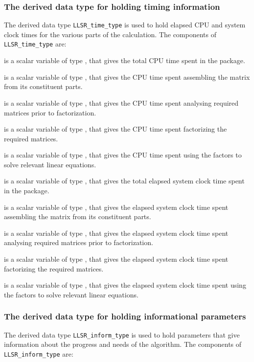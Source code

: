 \documentclass{galahad}
\newcommand{\packagename}{LLSR}
\begin{document}
\subsubsection{The derived data type for holding timing
 information}\label{typetime}
The derived data type
{\tt \packagename\_time\_type}
is used to hold elapsed CPU and system clock times for the various parts of
the calculation. The components of
{\tt \packagename\_time\_type}
are:
\begin{description}
 is a scalar variable of type \realdp, that gives
 the total CPU time spent in the package.

 is a scalar variable of type \realdp, that gives
 the CPU time spent assembling the matrix  from its constituent parts.

 is a scalar variable of type \realdp, that gives
 the CPU time spent analysing required matrices prior to factorization.

 is a scalar variable of type \realdp, that gives
 the CPU time spent factorizing the required matrices.

 is a scalar variable of type \realdp, that gives
 the CPU time spent using the factors to solve relevant linear equations.

 is a scalar variable of type \realdp, that gives
 the total elapsed system clock time spent in the package.

 is a scalar variable of type \realdp, that gives
 the elapsed system clock time spent assembling the matrix  from
its constituent parts.

 is a scalar variable of type \realdp, that gives
 the elapsed system clock time spent analysing required matrices prior to
factorization.

 is a scalar variable of type \realdp, that gives
 the elapsed system clock time spent factorizing the required matrices.

 is a scalar variable of type \realdp, that gives
 the elapsed system clock time spent using the factors to solve relevant
linear equations.

\end{description}


\subsubsection{The derived data type for holding informational
 parameters}\label{typeinform}
The derived data type
{\tt \packagename\_inform\_type}
is used to hold parameters that give information about the progress and needs
of the algorithm. The components of
{\tt \packagename\_inform\_type}
are:
\end{document}
